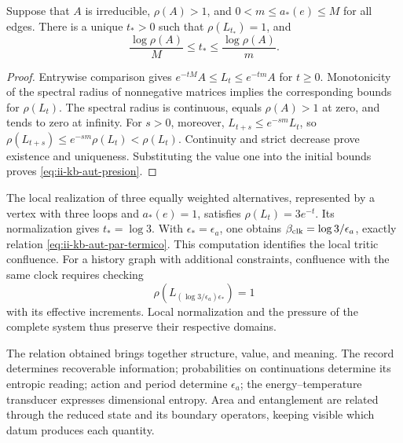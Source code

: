\begin{proposition}
Suppose that \(A\) is irreducible, \(\rho(A)>1\), and
\(0<m\leq a_*(e)\leq M\) for all edges. There is a unique
\(t_*>0\) such that \(\rho(L_{t_*})=1\), and
\begin{equation}
 \frac{\log\rho(A)}{M}\leq t_*\leq
 \frac{\log\rho(A)}{m}.
 \label{eq:ii-kb-aut-presion}
\end{equation}
\end{proposition}
\begin{proof}
Entrywise comparison gives
\(e^{-tM}A\leq L_t\leq e^{-tm}A\) for \(t\geq0\).
Monotonicity of the spectral radius of nonnegative matrices implies
the corresponding bounds for \(\rho(L_t)\). The spectral radius
is continuous, equals \(\rho(A)>1\) at zero, and tends to zero at infinity.
For \(s>0\), moreover,
\(L_{t+s}\leq e^{-sm}L_t\), so
\(\rho(L_{t+s})\leq e^{-sm}\rho(L_t)<\rho(L_t)\).
Continuity and strict decrease prove existence and
uniqueness. Substituting the value one into the initial bounds proves
\eqref{eq:ii-kb-aut-presion}.
\end{proof}

The local realization of three equally weighted alternatives, represented
by a vertex with three loops and \(a_*(e)=1\), satisfies
\(\rho(L_t)=3e^{-t}\). Its normalization gives \(t_*=\log3\).
With \(\epsilon_*=\epsilon_a\), one obtains
\(\beta_{\rm clk}=\log3/\epsilon_a\), exactly relation
\eqref{eq:ii-kb-aut-par-termico}. This computation identifies the
local tritic confluence. For a history graph with additional
constraints, confluence with the same clock requires checking
\[
 \rho\!\left(L_{(\log3/\epsilon_a)\epsilon_*}\right)=1
\]
with its effective increments. Local normalization and the pressure
of the complete system thus preserve their respective domains.

The relation obtained brings together structure, value, and meaning. The record
determines recoverable information; probabilities on
continuations determine its entropic reading; action and period
determine \(\epsilon_a\); the energy--temperature transducer
expresses dimensional entropy. Area and entanglement are
related through the reduced state and its boundary operators,
keeping visible which datum produces each quantity.
